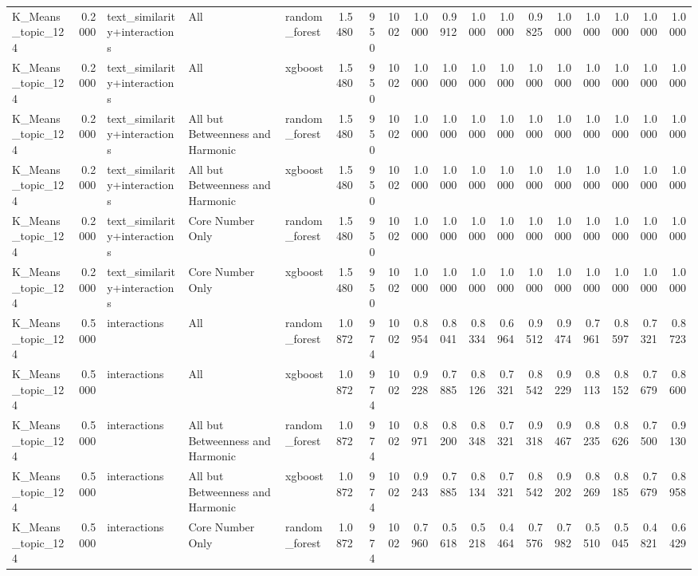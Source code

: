 \begin{tabular}{lrlllrrrrrrrrrrrrr}
K_Means_topic_124 & 0.2000 & text_similarity+interactions & All & random_forest & 1.5480 & 950 & 1002 & 1.0000 & 0.9912 & 1.0000 & 1.0000 & 0.9825 & 1.0000 & 1.0000 & 1.0000 & 1.0000 & 1.0000 \\
K_Means_topic_124 & 0.2000 & text_similarity+interactions & All & xgboost & 1.5480 & 950 & 1002 & 1.0000 & 1.0000 & 1.0000 & 1.0000 & 1.0000 & 1.0000 & 1.0000 & 1.0000 & 1.0000 & 1.0000 \\
K_Means_topic_124 & 0.2000 & text_similarity+interactions & All but Betweenness and Harmonic & random_forest & 1.5480 & 950 & 1002 & 1.0000 & 1.0000 & 1.0000 & 1.0000 & 1.0000 & 1.0000 & 1.0000 & 1.0000 & 1.0000 & 1.0000 \\
K_Means_topic_124 & 0.2000 & text_similarity+interactions & All but Betweenness and Harmonic & xgboost & 1.5480 & 950 & 1002 & 1.0000 & 1.0000 & 1.0000 & 1.0000 & 1.0000 & 1.0000 & 1.0000 & 1.0000 & 1.0000 & 1.0000 \\
K_Means_topic_124 & 0.2000 & text_similarity+interactions & Core Number Only & random_forest & 1.5480 & 950 & 1002 & 1.0000 & 1.0000 & 1.0000 & 1.0000 & 1.0000 & 1.0000 & 1.0000 & 1.0000 & 1.0000 & 1.0000 \\
K_Means_topic_124 & 0.2000 & text_similarity+interactions & Core Number Only & xgboost & 1.5480 & 950 & 1002 & 1.0000 & 1.0000 & 1.0000 & 1.0000 & 1.0000 & 1.0000 & 1.0000 & 1.0000 & 1.0000 & 1.0000 \\
K_Means_topic_124 & 0.5000 & interactions & All & random_forest & 1.0872 & 974 & 1002 & 0.8954 & 0.8041 & 0.8334 & 0.6964 & 0.9512 & 0.9474 & 0.7961 & 0.8597 & 0.7321 & 0.8723 \\
K_Means_topic_124 & 0.5000 & interactions & All & xgboost & 1.0872 & 974 & 1002 & 0.9228 & 0.7885 & 0.8126 & 0.7321 & 0.8542 & 0.9229 & 0.8113 & 0.8152 & 0.7679 & 0.8600 \\
K_Means_topic_124 & 0.5000 & interactions & All but Betweenness and Harmonic & random_forest & 1.0872 & 974 & 1002 & 0.8971 & 0.8200 & 0.8348 & 0.7321 & 0.9318 & 0.9467 & 0.8235 & 0.8626 & 0.7500 & 0.9130 \\
K_Means_topic_124 & 0.5000 & interactions & All but Betweenness and Harmonic & xgboost & 1.0872 & 974 & 1002 & 0.9243 & 0.7885 & 0.8134 & 0.7321 & 0.8542 & 0.9202 & 0.8269 & 0.8185 & 0.7679 & 0.8958 \\
K_Means_topic_124 & 0.5000 & interactions & Core Number Only & random_forest & 1.0872 & 974 & 1002 & 0.7960 & 0.5618 & 0.5218 & 0.4464 & 0.7576 & 0.7982 & 0.5510 & 0.5045 & 0.4821 & 0.6429 \\

\end{tabular}
